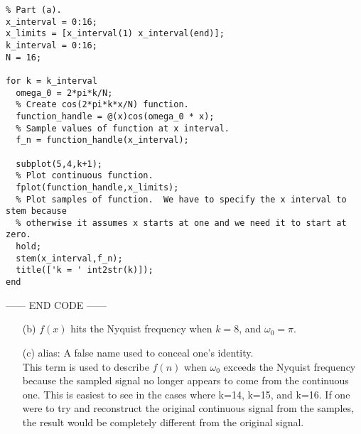 \documentclass[9pt]{article}
\begin{document}
\begin{enumerate}
\begin{verbatim}
% Part (a).
x_interval = 0:16;
x_limits = [x_interval(1) x_interval(end)];
k_interval = 0:16;
N = 16;

for k = k_interval
  omega_0 = 2*pi*k/N;
  % Create cos(2*pi*k*x/N) function.
  function_handle = @(x)cos(omega_0 * x);
  % Sample values of function at x interval.
  f_n = function_handle(x_interval);

  subplot(5,4,k+1);
  % Plot continuous function.
  fplot(function_handle,x_limits);
  % Plot samples of function.  We have to specify the x interval to stem because
  % otherwise it assumes x starts at one and we need it to start at zero.
  hold;
  stem(x_interval,f_n);
  title(['k = ' int2str(k)]);
end \end{verbatim}
      ------ END CODE ------ \\
      \begin{enumerate}
        \item[(b)]
          $ f(x) $ hits the Nyquist frequency when $ k = 8 $, and $ \omega_0 =
          \pi $. \\
        \item[(c)]
          alias: A false name used to conceal one's identity. \\
          This term is used to describe $ f(n) $ when $ \omega_0 $ exceeds the
          Nyquist frequency because the sampled signal no longer appears to
          come from the continuous one. This is easiest to see in the cases
          where k=14, k=15, and k=16. If one were to try and reconstruct the
          original continuous signal from the samples, the result would be
          completely different from the original signal.
      \end{enumerate}
  \end{enumerate}
\end{document}
